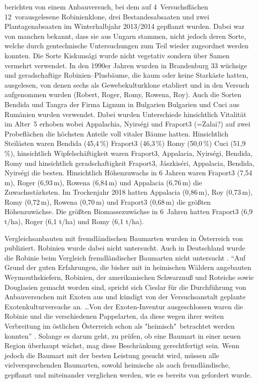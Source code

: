 \documentclass[twocolumn]{scrartcl}
\begin{document}
\citet{naujoks2005robinie,hofmann2020robinie,lange2021robinie,lange2022robinie}
berichten von einem Anbauversuch, bei dem auf 4~Versuchsflächen
12~vorausgelesene Robinienklone, drei Bestandesabsaaten und zwei
Plantagenabsaaten im Winterhalbjahr 2013/2014 gepflanzt wurden. Dabei
war von manchen bekannt, dass sie aus Ungarn stammen, nicht jedoch
deren Sorte, welche durch gentechnische Untersuchungen zum Teil wieder
zugeordnet werden konnten. Die Sorte Kiskunsági wurde nicht vegetativ
sondern über Samen vermehrt verwendet. In den 1990er Jahren wurden in
Brandenburg 33 wüchsige und geradschaftige Robinien--Plusbäume, die
kaum oder keine Starkäste hatten, ausgelesen, von denen sechs als
Gewebekulturklone etabliert und in den Versuch aufgenommen wurden
(Robert, Roger, Romy, Rowena, Roy). Auch die Sorten Bendida und Tangra
der Firma Lignum in Bulgarien Bulgarien und Cuci aus Rumänien wurden
verwendet. Dabei wurden Unterschiede hinsichtlich Vitalität im Alter~5
erhoben wobei Appalachia, Nyirségi und Fraport3 (=Zalai?) auf zwei
Probeflächen die höchsten Anteile voll vitaler Bäume
hatten. Hinsichtlich Steilästen waren Bendida (45,4\,\%) Fraport3
(46,3\,\%) Romy (50,0\,\%) Cuci (51,9\,\%), hinsichtlich
Wipfelschäftigkeit waren Fraport3, Appalacia, Nyirségi, Bendida, Romy
und hinsichtlich geradschaftigkeit Fraport3, Jászkiséri, Appalacia,
Bendida, Nyirségi die besten.  Hinsichtlich Höhenzuwachs in 6 Jahren
waren Fraport3 (7,54\,m), Roger (6,93\,m), Rowena (6,84\,m) und
Appalacia (6,76\,m) die Zuwachsstärksten. Im Trockenjahr 2018 hatten
Appalacia (0,86\,m), Roy (0,73\,m), Romy (0,72\,m), Rowena (0,70\,m)
und Fraport3 (0,68\,m) die größten Höhenzuwächse.  Die größten
Biomassezuwächse in 6~Jahren hatten Fraport3 (6,9 t/ha), Roger (6,1
t/ha) und Romy (6,1 t/ha).

Vergleichsanbauten mit fremdländischen Baumarten wurden in Österreich
von \citet{cieslar1901FremdlaendischeHolzarten} publiziert. Robinien
wurde dabei nicht untersucht. Auch in Deutschland wurde die Robinie
beim Vergleich fremdländischer Baumarten
nicht untersucht \citep{schwappach1902fremdlaendischeHolzarten}.
\enquote{Auf Grund der guten Erfahrungen, die bisher mit in heimischen
Wäldern angebauten Weymouthskiefern, Robinien, der amerikanischen
Schwarznuß und Roteiche sowie Douglasien gemacht worden sind, spricht
sich Cieslar für die Durchführung von Anbauversuchen mit Exoten aus
und kündigt von der Versuchsanstalt geplante Exotenkulturversuche
an. \dots Von der Exoten-Inventur ausgeschlossen waren die Robinie und
die verschiedenen Pappelarten, da diese wegen ihrer weiten Verbreitung
im östlichen Österreich schon als "heimisch"\ betrachtet werden
konnten} \citep{rannert1979FremdlaendischeBaumarten}. Solange es
darum geht, zu prüfen, ob eine Baumart in einer neuen Region überhaupt
wächst, mag diese Beschränkung gerechtfertigt sein.
Wenn jedoch die Baumart mit der besten Leistung gesucht wird,
müssen alle vielversprechenden Baumarten,
sowohl heimische als auch fremdländische, gepflanzt und miteinander verglichen werden,
wie es bereits von \citet{reaumur1721ertragstafel} gefordert wurde.
\end{document}
